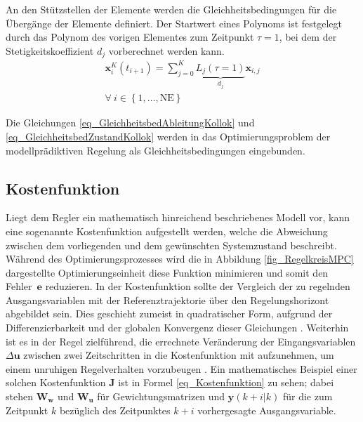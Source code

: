 An den Stützstellen der Elemente werden die Gleichheitsbedingungen für die Übergänge der Elemente definiert.
Der Startwert eines Polynoms ist festgelegt durch das Polynom des vorigen Elementes zum Zeitpunkt $\tau=1$, bei dem der Stetigkeitskoeffizient $d_j$ vorberechnet werden kann.
\begin{equation} \label{eq_GleichheitsbedZustandKollok}
    \begin{gathered}
        \boldsymbol{x}_i^K\left(t_{i+1}\right)=\sum_{j=0}^K \underbrace{L_j(\tau=1)}_{d_j} \boldsymbol{x}_{i, j}\\
        \forall~i\in \left\{1, \ldots, \mathrm{NE}\right\}
    \end{gathered}
\end{equation}

Die Gleichungen \ref{eq_GleichheitsbedAbleitungKollok} und \ref{eq_GleichheitsbedZustandKollok} werden in das Optimierungsproblem der modellprädiktiven Regelung als Gleichheitsbedingungen eingebunden.


\subsection{Kostenfunktion} \label{subsec_Kostenfunktion}
Liegt dem Regler ein mathematisch hinreichend beschriebenes Modell vor, kann eine sogenannte Kostenfunktion aufgestellt werden, welche die Abweichung zwischen dem vorliegenden und dem gewünschten Systemzustand beschreibt.
Während des Optimierungsprozesses wird die in Abbildung \ref{fig_RegelkreisMPC} dargestellte Optimierungseinheit diese Funktion minimieren und somit den Fehler~$\boldsymbol{e}$ reduzieren.
In der Kostenfunktion sollte der Vergleich der zu regelnden Ausgangsvariablen mit der Referenztrajektorie über den Regelungshorizont abgebildet sein.
Dies geschieht zumeist in quadratischer Form, aufgrund der Differenzierbarkeit und der globalen Konvergenz dieser Gleichungen \cite[S.24]{Diehl}\cite[S.3]{Schwenzer}.
Weiterhin ist es in der Regel zielführend, die errechnete Veränderung der Eingangsvariablen $\Delta \boldsymbol{u}$ zwischen zwei Zeitschritten in die Kostenfunktion mit aufzunehmen, um einem unruhigen Regelverhalten vorzubeugen \cite[S.24]{Diehl}.
Ein mathematisches Beispiel einer solchen Kostenfunktion $\boldsymbol{J}$ ist in Formel \ref{eq_Kostenfunktion} zu sehen; dabei stehen $\boldsymbol{W_w}$ und $\boldsymbol{W_u}$ für Gewichtungsmatrizen und $\boldsymbol{y}(k+i\rvert k)$ für die zum Zeitpunkt $k$ bezüglich des Zeitpunktes $k+i$ vorhergesagte Ausgangsvariable. \cite[S.3]{Schwenzer}

